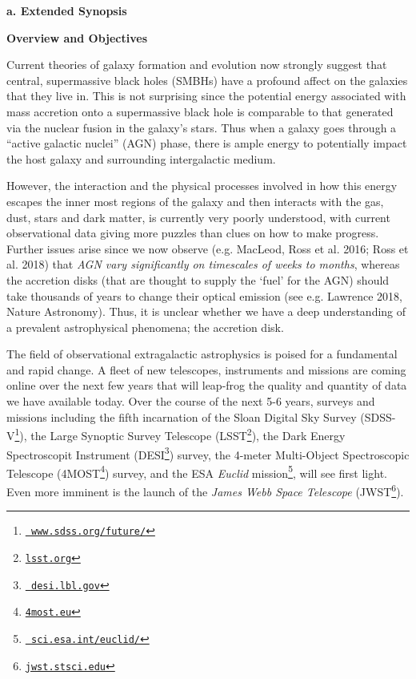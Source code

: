 \documentclass[oneside, a4paper, onecolumn, 11pt]{article}
\begin{document}
\smallskip
\smallskip
\noindent
{\bf{\textcolor{Cerulean}{a. Extended Synopsis}}} 
\vspace{6pt}

\noindent
\large
{\bf{\textcolor{Cerulean}{Overview and Objectives}}}
\normalsize


\smallskip
\smallskip
\noindent
Current theories of galaxy formation and evolution now strongly
suggest that central, supermassive black holes (SMBHs) have a profound
affect on the galaxies that they live in. This is not surprising since
the potential energy associated with mass accretion onto a
supermassive black hole is comparable to that generated via the
nuclear fusion in the galaxy's stars. Thus when a galaxy goes through
a ``active galactic nuclei'' (AGN) phase, there is ample energy to
potentially impact the host galaxy and surrounding intergalactic
medium.

\smallskip
\smallskip
\noindent
However, the interaction and the physical processes involved in how
this energy escapes the inner most regions of the galaxy and then
interacts with the gas, dust, stars and dark matter, is currently very
poorly understood, with current observational data giving more puzzles
than clues on how to make progress. Further issues arise since we now
observe (e.g. MacLeod, Ross et al. 2016; Ross et al. 2018) that {\it
AGN vary significantly on timescales of weeks to months}, whereas the
accretion disks (that are thought to supply the `fuel' for the AGN)
should take thousands of years to change their optical emission (see
e.g. Lawrence 2018, Nature Astronomy).  Thus, it is unclear whether we
have a deep understanding of a prevalent astrophysical phenomena; the
accretion disk.


\smallskip
\smallskip
\noindent
The field of observational extragalactic astrophysics is poised for a
fundamental and rapid change. 
A fleet of new telescopes, instruments and missions are coming 
online over the next few years that will leap-frog the quality and
quantity of data we have available today. Over the course of the next
5-6 years, surveys and missions including the fifth incarnation of the
Sloan Digital Sky Survey
(SDSS-V\footnote{\href{www.sdss.org/future/}{{\tt
www.sdss.org/future/}}}), the Large Synoptic Survey Telescope
(LSST\footnote{\href{lsst.org}{{\tt lsst.org}}}), the Dark Energy
Spectroscopit Instrument (DESI\footnote{\href{desi.lbl.gov}{{\tt
desi.lbl.gov}}}) survey, the 4-meter Multi-Object Spectroscopic
Telescope (4MOST\footnote{\href{4most.eu}{{\tt 4most.eu}}}) survey,
and the ESA {\it Euclid}
mission\footnote{\href{sci.esa.int/euclid/}{{\tt
sci.esa.int/euclid/}}}, will see first light. Even more imminent is
the launch of the {\it James Webb Space Telescope}
(JWST\footnote{\href{jwst.stsci.edu}{{\tt jwst.stsci.edu}}}).
\end{document}
